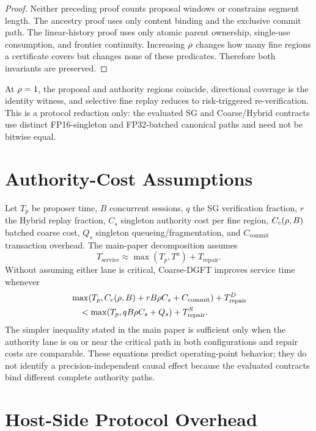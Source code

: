 \begin{proof}
Neither preceding proof counts proposal windows or constrains segment length.
The ancestry proof uses only content binding and the exclusive commit path.
The linear-history proof uses only atomic parent ownership, single-use
consumption, and frontier continuity. Increasing $\rho$ changes how
many fine regions a certificate covers but changes none of these predicates.
Therefore both invariants are preserved.
\end{proof}

At $\rho=1$, the proposal and authority regions coincide, directional
coverage is the identity witness, and selective fine replay reduces to
risk-triggered re-verification. This is a protocol reduction only: the
evaluated SG and Coarse/Hybrid contracts use distinct FP16-singleton and
FP32-batched canonical paths and need not be bitwise equal.

\section{Authority-Cost Assumptions}\label{supp:cost}

Let $T_p$ be proposer time, $B$ concurrent sessions, $q$ the SG verification
fraction, $r$ the Hybrid replay fraction, $C_s$ singleton authority cost per
fine region, $C_c(\rho,B)$ batched coarse cost, $Q_s$ singleton
queueing/fragmentation, and $C_{\mathrm{commit}}$ transaction overhead. The
main-paper decomposition assumes
\[
 T_{\mathrm{service}}\approx\max(T_p,T^a)+T_{\mathrm{repair}}.
\]
Without assuming either lane is critical, Coarse-DGFT improves service time
whenever
\[
\begin{split}
 &\max\!\left(T_p,C_c(\rho,B)+rB\rho C_s+
 C_{\mathrm{commit}}\right)+T_{\mathrm{repair}}^D\\
 &\quad<\max\!\left(T_p,qB\rho C_s+Q_s\right)
 +T_{\mathrm{repair}}^S.
\end{split}
\]
The simpler inequality stated in the main paper is sufficient only when the
authority lane is on or near the critical path in both configurations and
repair costs are comparable. These equations predict operating-point
behavior; they do not identify a precision-independent causal effect because
the evaluated contracts bind different complete authority paths.

\section{Host-Side Protocol Overhead}\label{supp:overhead}

